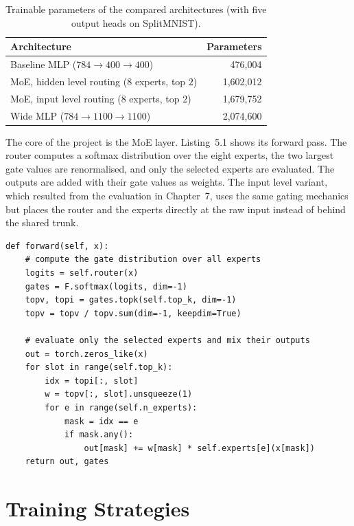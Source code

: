 \begin{table}[H]
  \centering
  \caption{Trainable parameters of the compared architectures (with five
  output heads on SplitMNIST).}
  \label{tab:params}
  \begin{tabular}{lr}
    \toprule
    \textbf{Architecture} & \textbf{Parameters} \\
    \midrule
    Baseline MLP ($784{\rightarrow}400{\rightarrow}400$) & 476{,}004 \\
    MoE, hidden level routing ($8$ experts, top $2$)     & 1{,}602{,}012 \\
    MoE, input level routing ($8$ experts, top $2$)      & 1{,}679{,}752 \\
    Wide MLP ($784{\rightarrow}1100{\rightarrow}1100$)    & 2{,}074{,}600 \\
    \bottomrule
  \end{tabular}
\end{table}

The core of the project is the MoE layer. Listing~5.1 shows its forward
pass. The router computes a softmax distribution over the eight experts,
the two largest gate values are renormalised, and only the selected experts
are evaluated. The outputs are added with their gate values as weights. The
input level variant, which resulted from the evaluation in Chapter~7, uses
the same gating mechanics but places the router and the experts directly at
the raw input instead of behind the shared trunk.

\begin{lstlisting}[caption={Forward pass of the sparsely gated MoE layer
(excerpt from \texttt{models.py}).}, label={lst:moelayer}]
def forward(self, x):
    # compute the gate distribution over all experts
    logits = self.router(x)
    gates = F.softmax(logits, dim=-1)
    topv, topi = gates.topk(self.top_k, dim=-1)
    topv = topv / topv.sum(dim=-1, keepdim=True)

    # evaluate only the selected experts and mix their outputs
    out = torch.zeros_like(x)
    for slot in range(self.top_k):
        idx = topi[:, slot]
        w = topv[:, slot].unsqueeze(1)
        for e in range(self.n_experts):
            mask = idx == e
            if mask.any():
                out[mask] += w[mask] * self.experts[e](x[mask])
    return out, gates
\end{lstlisting}

\section{Training Strategies}
\label{sec:implstrategies}

